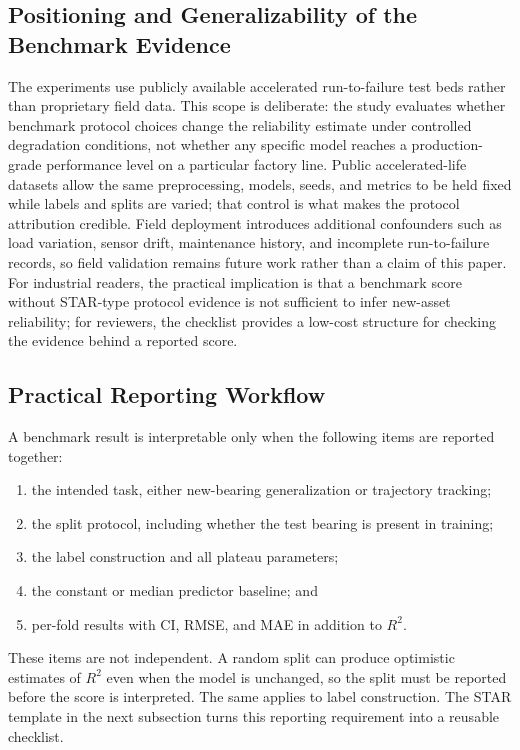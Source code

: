 \documentclass[pdflatex,sn-mathphys-num]{sn-jnl}
\begin{document}
\subsection{Positioning and Generalizability of the Benchmark Evidence}
The experiments use publicly available accelerated run-to-failure test beds rather than proprietary field data. This scope is deliberate: the study evaluates whether benchmark protocol choices change the reliability estimate under controlled degradation conditions, not whether any specific model reaches a production-grade performance level on a particular factory line. Public accelerated-life datasets allow the same preprocessing, models, seeds, and metrics to be held fixed while labels and splits are varied; that control is what makes the protocol attribution credible. Field deployment introduces additional confounders such as load variation, sensor drift, maintenance history, and incomplete run-to-failure records, so field validation remains future work rather than a claim of this paper. For industrial readers, the practical implication is that a benchmark score without STAR-type protocol evidence is not sufficient to infer new-asset reliability; for reviewers, the checklist provides a low-cost structure for checking the evidence behind a reported score.

\subsection{Practical Reporting Workflow}
A benchmark result is interpretable only when the following items are reported together:
\begin{enumerate}
    \item the intended task, either new-bearing generalization or trajectory tracking;
    \item the split protocol, including whether the test bearing is present in training;
    \item the label construction and all plateau parameters;
    \item the constant or median predictor baseline; and
    \item per-fold results with CI, RMSE, and MAE in addition to $R^2$.
\end{enumerate}
These items are not independent. A random split can produce optimistic estimates of $R^2$ even when the model is unchanged, so the split must be reported before the score is interpreted. The same applies to label construction. The STAR template in the next subsection turns this reporting requirement into a reusable checklist.
\end{document}

